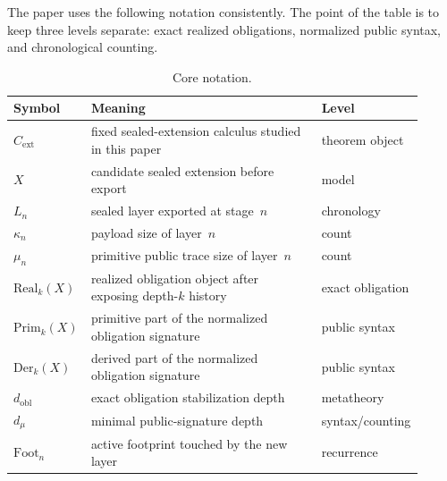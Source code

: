 \documentclass{lmcs}
\newcommand{\Real}{\mathrm{Real}}
\newcommand{\Prim}{\mathrm{Prim}}
\newcommand{\Der}{\mathrm{Der}}
\newcommand{\Foot}{\mathrm{Foot}}
\newcommand{\Cext}{C_{\mathrm{ext}}}
\begin{document}
The paper uses the following notation consistently. The point of the table is
to keep three levels separate: exact realized obligations, normalized public
syntax, and chronological counting.

\begin{table}[t]
\centering
\caption{Core notation.}
\label{tab:notation}
\small
\begin{tabular}{@{}p{0.18\linewidth}p{0.56\linewidth}p{0.17\linewidth}@{}}
\toprule
Symbol & Meaning & Level \\
\midrule
$\Cext$ & fixed sealed-extension calculus studied in this paper & theorem object \\
$X$ & candidate sealed extension before export & model \\
$L_n$ & sealed layer exported at stage~$n$ & chronology \\
$\kappa_n$ & payload size of layer~$n$ & count \\
$\mu_n$ & primitive public trace size of layer~$n$ & count \\
$\Real_k(X)$ & realized obligation object after exposing depth-$k$ history & exact obligation \\
$\Prim_k(X)$ & primitive part of the normalized obligation signature & public syntax \\
$\Der_k(X)$ & derived part of the normalized obligation signature & public syntax \\
$d_{\mathrm{obl}}$ & exact obligation stabilization depth & metatheory \\
$d_\mu$ & minimal public-signature depth & syntax/counting \\
$\Foot_n$ & active footprint touched by the new layer & recurrence \\
\bottomrule
\end{tabular}
\end{table}
\end{document}
